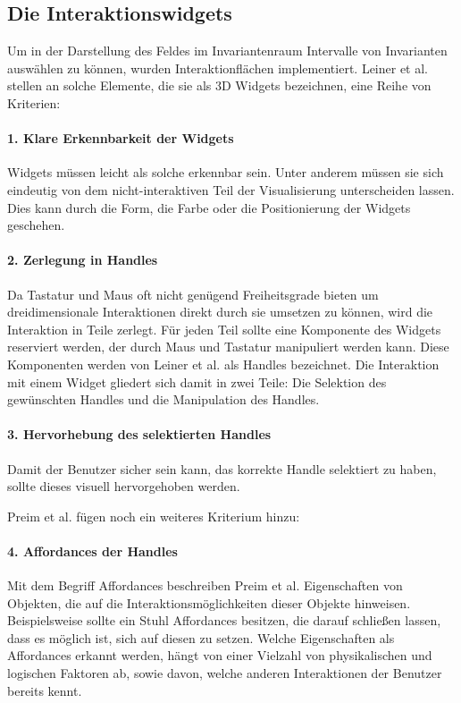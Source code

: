 \documentclass[a4paper,fontsize=12pt,toc=bib,parskip=half,ngerman]{scrartcl}
\begin{document}
\subsection{Die Interaktionswidgets}
\label{sec:Widget}
Um in der Darstellung des Feldes im Invariantenraum Intervalle von Invarianten ausw\"ahlen zu k\"onnen, wurden Interaktionfl\"achen implementiert. Leiner et al. \cite{leiner1997entwicklung} stellen an solche Elemente, die sie als \glq 3D Widgets\grq{} bezeichnen, eine Reihe von Kriterien:

\paragraph{1. Klare Erkennbarkeit der Widgets}
Widgets m\"ussen leicht als solche erkennbar sein. Unter anderem m\"ussen sie sich eindeutig von dem nicht-interaktiven Teil der Visualisierung unterscheiden lassen. Dies kann durch die Form, die Farbe oder die Positionierung der Widgets geschehen.

\paragraph{2. Zerlegung in Handles}
Da Tastatur und Maus oft nicht gen\"ugend Freiheitsgrade bieten um dreidimensionale Interaktionen direkt durch sie umsetzen zu k\"onnen, wird die Interaktion in Teile zerlegt. F\"ur jeden Teil sollte eine Komponente des Widgets reserviert werden, der durch Maus und Tastatur manipuliert werden kann. Diese Komponenten werden von Leiner et al. als \glq Handles\grq{} bezeichnet. Die Interaktion mit einem Widget gliedert sich damit in zwei Teile: Die Selektion des gew\"unschten Handles und die Manipulation des Handles.

\paragraph{3. Hervorhebung des selektierten Handles}
Damit der Benutzer sicher sein kann, das korrekte Handle selektiert zu haben, sollte dieses visuell hervorgehoben werden.

Preim et al. \cite[S.~340]{preim2015interaktive} f\"ugen noch ein weiteres Kriterium hinzu:

\paragraph{4. Affordances der Handles}
Mit dem Begriff \glq Affordances\grq{} beschreiben Preim et al. \cite[S.~137]{preim2010interaktive} Eigenschaften von Objekten, die auf die Interaktionsm\"oglichkeiten dieser Objekte hinweisen. Beispielsweise sollte ein Stuhl Affordances besitzen, die darauf schlie{\ss}en lassen, dass es m\"oglich ist, sich auf diesen zu setzen. Welche Eigenschaften als Affordances erkannt werden, h\"angt von einer Vielzahl von physikalischen und logischen Faktoren ab, sowie davon, welche anderen Interaktionen der Benutzer bereits kennt.
\end{document}
